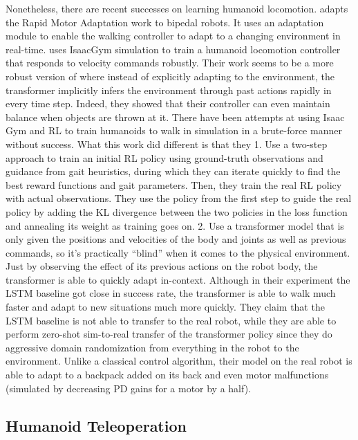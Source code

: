 Nonetheless, there are recent successes on learning humanoid locomotion.
\cite{kumar2022adapting} adapts the Rapid Motor Adaptation work \cite{kumar2021rma} to bipedal robots. It uses an adaptation module to enable the walking controller to adapt to a changing environment in real-time. \cite{radosavovic2023learning} uses IsaacGym simulation to train a humanoid locomotion controller that responds to velocity commands robustly. Their work seems to be a more robust version of \cite{kumar2022adapting} where instead of explicitly adapting to the environment, the transformer implicitly infers the environment through past actions rapidly in every time step. Indeed, they showed that their controller can even maintain balance when objects are thrown at it. There have been attempts at using Isaac Gym and RL to train humanoids to walk in simulation in a brute-force manner without success. What this work did different is that they
1. Use a two-step approach to train an initial RL policy using ground-truth observations and guidance from gait heuristics, during which they can iterate quickly to find the best reward functions and gait parameters. Then, they train the real RL policy with actual observations. They use the policy from the first step to guide the real policy by adding the KL divergence between the two policies in the loss function and annealing its weight as training goes on.
2. Use a transformer model that is only given the positions and velocities of the body and joints as well as previous commands, so it’s practically “blind” when it comes to the physical environment. Just by observing the effect of its previous actions on the robot body, the transformer is able to quickly adapt in-context. Although in their experiment the LSTM baseline got close in success rate, the transformer is able to walk much faster and adapt to new situations much more quickly. They claim that the LSTM baseline is not able to transfer to the real robot, while they are able to perform zero-shot sim-to-real transfer of the transformer policy since they do aggressive domain randomization from everything in the robot to the environment. Unlike a classical control algorithm, their model on the real robot is able to adapt to a backpack added on its back and even motor malfunctions (simulated by decreasing PD gains for a motor by a half).

\subsection{Humanoid Teleoperation}

